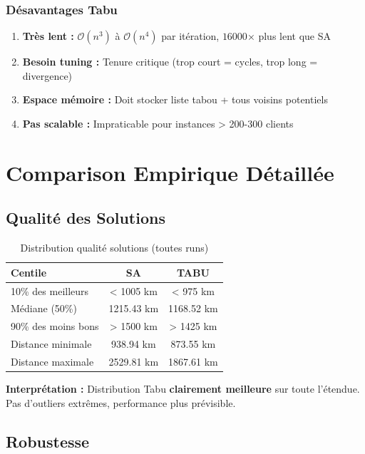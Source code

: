 \documentclass[12pt,a4paper,twoside]{report}
\begin{document}
\subsubsection{Désavantages Tabu}

\begin{enumerate}
    \item \textbf{Très lent :} $\mathcal{O}(n^3)$ à $\mathcal{O}(n^4)$ par itération, $16000$× plus lent que SA
    \item \textbf{Besoin tuning :} Tenure critique (trop court = cycles, trop long = divergence)
    \item \textbf{Espace mémoire :} Doit stocker liste tabou + tous voisins potentiels
    \item \textbf{Pas scalable :} Impraticable pour instances > 200-300 clients
\end{enumerate}

\section{Comparison Empirique Détaillée}

\subsection{Qualité des Solutions}

\begin{table}[H]
    \centering
    \caption{Distribution qualité solutions (toutes runs)}
    \begin{tabular}{|l|c|c|}
        \hline
        \textbf{Centile}    & \textbf{SA} & \textbf{TABU} \\
        \hline
        10\% des meilleurs  & < 1005 km   & < 975 km      \\
        Médiane (50\%)      & 1215.43 km  & 1168.52 km    \\
        90\% des moins bons & > 1500 km   & > 1425 km     \\
        Distance minimale   & 938.94 km   & 873.55 km     \\
        Distance maximale   & 2529.81 km  & 1867.61 km    \\
        \hline
    \end{tabular}
\end{table}

\textbf{Interprétation :} Distribution Tabu \textbf{clairement meilleure} sur toute l'étendue. Pas d'outliers extrêmes, performance plus prévisible.

\subsection{Robustesse}
\end{document}
